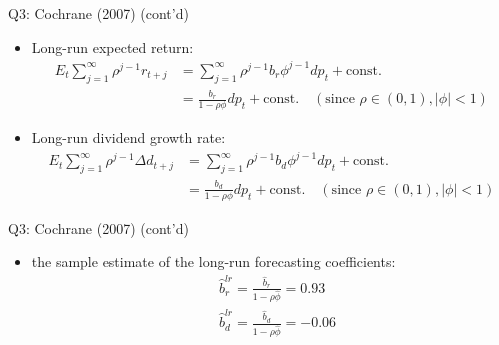 \documentclass[10pt,t]{beamer}
\begin{document}
\begin{frame}{Q3: Cochrane (2007) (cont'd)}
\begin{itemize}
  \item Long-run expected return:
  \begin{equation*}
  \begin{split}
  E_{t} \sum_{j = 1}^{\infty} \rho^{j - 1} r_{t+j} & = \sum_{j = 1}^{\infty} \rho^{j - 1} b_r \phi^{j - 1} dp_t + \text{const.}\\
  & = \frac{b_r}{1 - \rho\phi}dp_t + \text{const.} \quad(\text{since } \rho \in (0,1), \vert\phi\vert < 1)
  \end{split}
  \end{equation*}
  \item Long-run dividend growth rate:
  \begin{equation*}
  \begin{split}
  E_{t} \sum_{j = 1}^{\infty} \rho^{j - 1} \Delta d_{t+j} & = \sum_{j = 1}^{\infty} \rho^{j - 1} b_d \phi^{j - 1} dp_t + \text{const.}\\
  & = \frac{b_d}{1 - \rho\phi}dp_t + \text{const.} \quad(\text{since } \rho \in (0,1), \vert\phi\vert < 1)
  \end{split}
  \end{equation*}
\end{itemize}
\end{frame}

\begin{frame}{Q3: Cochrane (2007) (cont'd)}
\begin{itemize}
  \item the sample estimate of the long-run forecasting coefficients:
  \begin{equation*}
  \begin{split}
  & \hat{b}_{r}^{lr} = \frac{\hat{b}_r}{1 - \rho\hat{\phi}} = 0.93 \\
  & \hat{b}_{d}^{lr} = \frac{\hat{b}_d}{1 - \rho\hat{\phi}} = -0.06
  \end{split}
  \end{equation*}
\end{itemize}
\end{frame}
\end{document}
